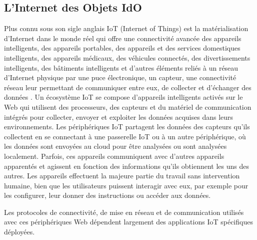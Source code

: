 \documentclass[french, a4paper, 12pt]{report}
\begin{document}
\subsection{L’Internet des Objets IdO}
Plus connu sous son sigle anglais IoT (Internet of Things) est la matérialisation d’Internet dans le monde réel qui offre une connectivité avancée des appareils intelligents, des appareils portables, des appareils et des services domestiques intelligents, des appareils médicaux, des véhicules connectés, des divertissements intelligents, des bâtiments intelligents et d’autres éléments reliés à un réseau d’Internet physique par une puce électronique, un capteur, une connectivité réseau leur permettant de communiquer entre eux, de collecter et d’échanger des données \cite{8}.
Un écosystème IoT se compose d’appareils intelligents activés sur le Web qui utilisent des processeurs, des capteurs et du matériel de communication intégrés pour collecter, envoyer et exploiter les données acquises dans leurs environnements. 
Les périphériques IoT partagent les données des capteurs qu'ils collectent en se connectant à une passerelle IoT ou à un autre périphérique, où les données sont envoyées au cloud pour être analysées ou sont analysées localement. Parfois, ces appareils communiquent avec d’autres appareils apparentés et agissent en fonction des informations qu’ils obtiennent les uns des autres. Les appareils effectuent la majeure partie du travail sans intervention humaine, bien que les utilisateurs puissent interagir avec eux, par exemple pour les configurer, leur donner des instructions ou accéder aux données.

Les protocoles de connectivité, de mise en réseau et de communication utilisés avec ces périphériques Web dépendent largement des applications IoT spécifiques déployées.
\end{document}
